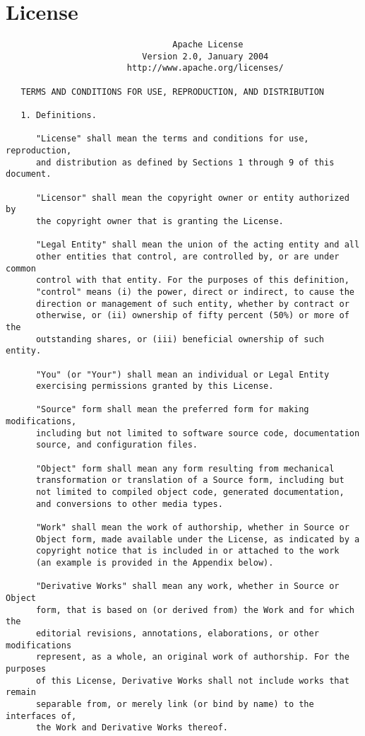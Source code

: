 \documentclass[11pt, final, a4paper]{article}
\begin{document}
	\section{License}
	\begin{verbatim}
                                 Apache License
                           Version 2.0, January 2004
                        http://www.apache.org/licenses/
	
   TERMS AND CONDITIONS FOR USE, REPRODUCTION, AND DISTRIBUTION

   1. Definitions.

      "License" shall mean the terms and conditions for use, reproduction,
      and distribution as defined by Sections 1 through 9 of this document.

      "Licensor" shall mean the copyright owner or entity authorized by
      the copyright owner that is granting the License.

      "Legal Entity" shall mean the union of the acting entity and all
      other entities that control, are controlled by, or are under common
      control with that entity. For the purposes of this definition,
      "control" means (i) the power, direct or indirect, to cause the
      direction or management of such entity, whether by contract or
      otherwise, or (ii) ownership of fifty percent (50%) or more of the
      outstanding shares, or (iii) beneficial ownership of such entity.

      "You" (or "Your") shall mean an individual or Legal Entity
      exercising permissions granted by this License.

      "Source" form shall mean the preferred form for making modifications,
      including but not limited to software source code, documentation
      source, and configuration files.

      "Object" form shall mean any form resulting from mechanical
      transformation or translation of a Source form, including but
      not limited to compiled object code, generated documentation,
      and conversions to other media types.

      "Work" shall mean the work of authorship, whether in Source or
      Object form, made available under the License, as indicated by a
      copyright notice that is included in or attached to the work
      (an example is provided in the Appendix below).

      "Derivative Works" shall mean any work, whether in Source or Object
      form, that is based on (or derived from) the Work and for which the
      editorial revisions, annotations, elaborations, or other modifications
      represent, as a whole, an original work of authorship. For the purposes
      of this License, Derivative Works shall not include works that remain
      separable from, or merely link (or bind by name) to the interfaces of,
      the Work and Derivative Works thereof.


\end{verbatim}
\end{document}

